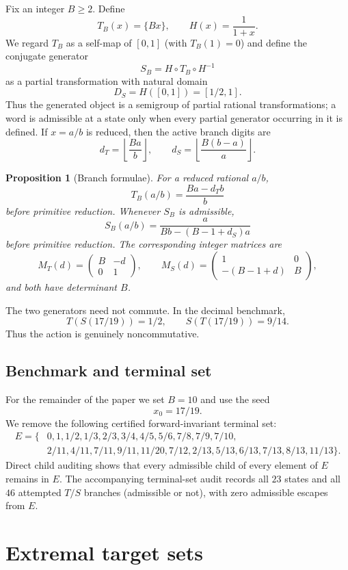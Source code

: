 \documentclass[11pt]{amsart}
\newtheorem{proposition}[theorem]{Proposition}
\theoremstyle{definition}
\begin{document}
Fix an integer $B\ge2$.  Define
\[
T_B(x)=\{Bx\},\qquad H(x)=\frac1{1+x}.
\]
We regard $T_B$ as a self-map of $[0,1]$ (with $T_B(1)=0$) and define the conjugate generator
\[
S_B=H\circ T_B\circ H^{-1}
\]
as a partial transformation with natural domain
\[
D_S=H([0,1])=[1/2,1].
\]
Thus the generated object is a semigroup of partial rational transformations; a word is admissible at a state only when every partial generator occurring in it is defined.  If $x=a/b$ is reduced, then the active branch digits are
\[
d_T=\left\lfloor\frac{Ba}{b}\right\rfloor,
\qquad
 d_S=\left\lfloor\frac{B(b-a)}{a}\right\rfloor.
\]

\begin{proposition}[Branch formulae]
For a reduced rational $a/b$,
\[
T_B(a/b)=\frac{Ba-d_Tb}{b}
\]
before primitive reduction.  Whenever $S_B$ is admissible,
\[
S_B(a/b)=\frac{a}{Bb-(B-1+d_S)a}
\]
before primitive reduction.
The corresponding integer matrices are
\[
M_T(d)=\begin{pmatrix}B&-d\\0&1\end{pmatrix},
\qquad
M_S(d)=\begin{pmatrix}1&0\\-(B-1+d)&B\end{pmatrix},
\]
and both have determinant $B$.
\end{proposition}

The two generators need not commute.  In the decimal benchmark,
\[
T(S(17/19))=1/2,
\qquad
S(T(17/19))=9/14.
\]
Thus the action is genuinely noncommutative.

\subsection{Benchmark and terminal set}

For the remainder of the paper we set $B=10$ and use the seed
\[
x_0=17/19.
\]
We remove the following certified forward-invariant terminal set:
\begin{align*}
E=\{&0,1,1/2,1/3,2/3,3/4,4/5,5/6,7/8,7/9,7/10,\\
&2/11,4/11,7/11,9/11,11/20,7/12,2/13,5/13,6/13,7/13,8/13,11/13\}.
\end{align*}
Direct child auditing shows that every admissible child of every element of $E$ remains in $E$.  The accompanying terminal-set audit records all $23$ states and all $46$ attempted $T/S$ branches (admissible or not), with zero admissible escapes from $E$.

\section{Extremal target sets}
\end{document}
